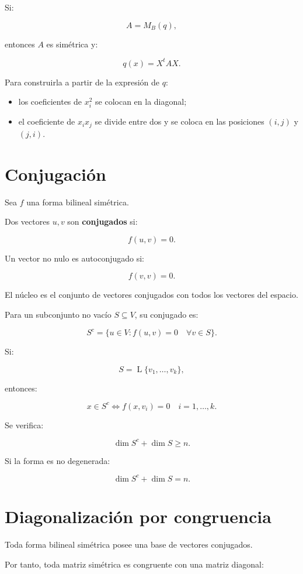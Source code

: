 \documentclass[11pt,a4paper]{article}
\newcommand{\Span}{\operatorname{L}}
\begin{document}
Si:

\[
A=M_B(q),
\]

entonces $A$ es simétrica y:

\[
\boxed{
q(x)=X^tAX.
}
\]

Para construirla a partir de la expresión de $q$:

\begin{itemize}
\item los coeficientes de $x_i^2$ se colocan en la diagonal;
\item el coeficiente de $x_ix_j$ se divide entre dos y se coloca en las posiciones $(i,j)$ y $(j,i)$.
\end{itemize}

\section{Conjugación}

Sea $f$ una forma bilineal simétrica.

Dos vectores $u,v$ son \textbf{conjugados} si:

\[
\boxed{
f(u,v)=0.
}
\]

Un vector no nulo es autoconjugado si:

\[
f(v,v)=0.
\]

El núcleo es el conjunto de vectores conjugados con todos los vectores del espacio.

Para un subconjunto no vacío $S\subseteq V$, su conjugado es:

\[
\boxed{
S^c
=
\{u\in V:f(u,v)=0\quad\forall v\in S\}.
}
\]

Si:

\[
S=\Span\{v_1,\ldots,v_k\},
\]

entonces:

\[
x\in S^c
\iff
f(x,v_i)=0
\quad
i=1,\ldots,k.
\]

Se verifica:

\[
\boxed{
\dim S^c+\dim S\geq n.
}
\]

Si la forma es no degenerada:

\[
\boxed{
\dim S^c+\dim S=n.
}
\]

\section{Diagonalización por congruencia}

Toda forma bilineal simétrica posee una base de vectores conjugados.

Por tanto, toda matriz simétrica es congruente con una matriz diagonal:
\end{document}
